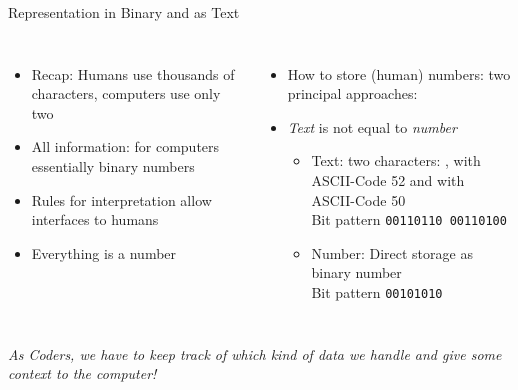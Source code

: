 
\begin{frame}[fragile]{Representation in Binary and as Text}
%
\begin{columns}[T]
\begin{itemize}
\item Recap: Humans use thousands of characters, computers use only two
\item All information: for computers essentially binary numbers
\item Rules for interpretation allow interfaces to humans
\item[\Thus] Everything is a number
\end{itemize}
%
\begin{itemize}
\item How to store (human) numbers: two principal approaches:
\item \emph{Text}  is not equal to \emph{number} 
	\begin{itemize}
	\item Text: two characters: , with ASCII-Code 52 and  with ASCII-Code 50\\
		Bit pattern \texttt{00110110 00110100}
	\item Number: Direct storage as binary number\\
		Bit pattern \texttt{00101010}
	\end{itemize}
\end{itemize}
\end{columns}
%
\begin{center}
	\begin{large}
	\Thus \emph{As Coders, we have to keep track of which kind of data we handle and give some context to the computer!}
	\end{large}
\end{center}
%
\end{frame}


